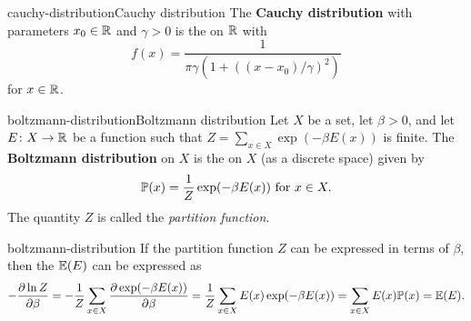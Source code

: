 \begin{topic}{cauchy-distribution}{Cauchy distribution}
    The \textbf{Cauchy distribution} with parameters $x_0 \in \mathbb{R}$ and $\gamma > 0$ is the  on $\mathbb{R}$ with 
    \[ f(x) = \frac{1}{\pi \gamma (1 + ((x - x_0) / \gamma)^2)} \]
    for $x \in \mathbb{R}$.
\end{topic}

    

\begin{topic}{boltzmann-distribution}{Boltzmann distribution}
    Let $X$ be a set, let $\beta > 0$, and let $E \colon X \to \mathbb{R}$ be a function such that $Z = \sum_{x \in X} \exp(- \beta E(x))$ is finite. The \textbf{Boltzmann distribution} on $X$ is the  on $X$ (as a discrete space) given by
    \[ \mathbb{P}(x) = \frac{1}{Z} \exp(- \beta E(x)) \textup{ for } x \in X . \]
    The quantity $Z$ is called the \textit{partition function}.
\end{topic}

\begin{example}{boltzmann-distribution}
    If the partition function $Z$ can be expressed in terms of $\beta$, then the  $\mathbb{E}(E)$ can be expressed as
    \[ - \frac{\partial \ln Z}{\partial \beta} = - \frac{1}{Z} \sum_{x \in X} \frac{\partial \exp(- \beta E(x))}{\partial \beta} = \frac{1}{Z} \sum_{x \in X} E(x) \exp(- \beta E(x)) = \sum_{x \in X} E(x) \mathbb{P}(x) = \mathbb{E}(E) . \]
\end{example}
